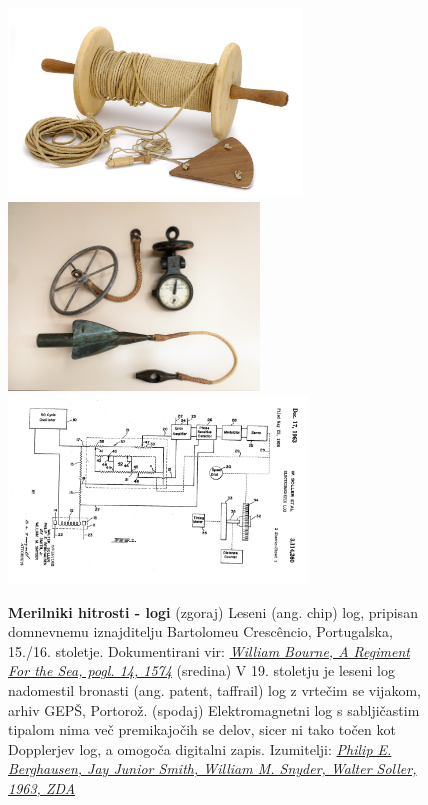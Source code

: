 
\begin{figure}
	\centering
	\includegraphics[height=5cm]{Predavanja/01_Uvod/figs/LeseniLog.jpg}
	\includegraphics[height=5cm]{Predavanja/01_Uvod/figs/BronastiLog_2016-11-25_k.jpg} %
	\includegraphics[height=5cm]{Predavanja/01_Uvod/figs/US3114260-0_EM-Log.png}
	\caption{\textbf{Merilniki hitrosti - logi} (zgoraj) Leseni (ang. chip) log, pripisan domnevnemu iznajditelju Bartolomeu Crescêncio, Portugalska, 15./16. stoletje. Dokumentirani vir: \href{http://quod.lib.umich.edu/cgi/t/text/text-idx?c=eebo;idno=A16510.0001.001}{\textit{William Bourne, A Regiment For the Sea, pogl. 14, 1574}} (sredina) V 19. stoletju je leseni log nadomestil bronasti (ang. patent, taffrail) log z vrtečim se vijakom, arhiv GEPŠ, Portorož. (spodaj) Elektromagnetni log s sabljičastim tipalom nima več premikajočih se delov, sicer ni tako točen kot Dopplerjev log, a omogoča digitalni zapis. Izumitelji: \href{https://www.google.com/patents/US3114260}{\textit{Philip E. Berghausen, Jay Junior Smith, William M. Snyder, Walter Soller, 1963, ZDA}}}
	\label{fig:Logi}       %
\end{figure}


